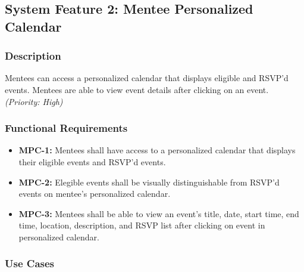 \subsection{System Feature 2: Mentee Personalized Calendar} 


\subsubsection{Description}
Mentees can access a personalized calendar that displays eligible and RSVP'd
events. Mentees are able to view event details after clicking on an event.
\textit{(Priority: High)}



\subsubsection{Functional Requirements}

\begin{itemize}[label=$\bullet$]
    \item \textbf{MPC-1:} Mentees shall have access to a personalized calendar
    that displays their eligible events and RSVP'd events.

    \item \textbf{MPC-2:} Elegible events shall be visually distinguishable from
    RSVP'd events on mentee's personalized calendar.

    \item \textbf{MPC-3:} Mentees shall be able to view an event's title, date,
    start time, end time, location, description, and RSVP list after clicking on
    event in personalized calendar.
\end{itemize}



\subsubsection{Use Cases}

